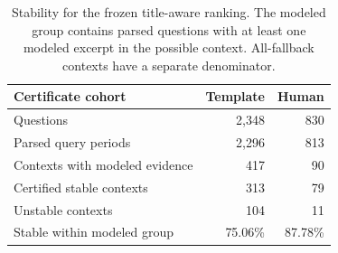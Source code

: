 \begin{table}[t]
\centering\small
\begin{tabular}{@{}lrr@{}}
\toprule
Certificate cohort & Template & Human\\
\midrule
Questions & 2,348 & 830\\
Parsed query periods & 2,296 & 813\\
Contexts with modeled evidence & 417 & 90\\
Certified stable contexts & 313 & 79\\
Unstable contexts & 104 & 11\\
Stable within modeled group & 75.06\% & 87.78\%\\
\bottomrule
\end{tabular}
\caption{Stability for the frozen title-aware ranking. The modeled group contains parsed questions with at least one modeled excerpt in the possible context. All-fallback contexts have a separate denominator.}
\label{tab:mechanism}
\end{table}
